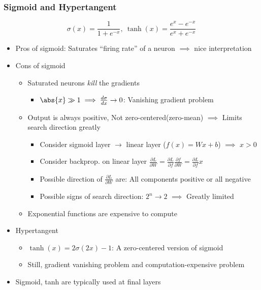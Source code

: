 \subsubsection*{Sigmoid and Hypertangent}
\begin{equation}
    \sigma(x)=\frac{1}{1+e^{-x}},~\tanh(x)=\frac{e^x-e^{-x}}{e^x+e^{-x}}
\end{equation}
\begin{itemize}
    \item Pros of sigmoid: Saturates ``firing rate'' of a neuron $\implies$ nice interpretation
    \item Cons of sigmoid
    \begin{itemize}
        \item Saturated neurons \textit{kill} the gradients
        \begin{itemize}
            \item $\abs{x}\gg1\implies\frac{d\sigma}{dx}\to0$: Vanishing gradient problem
        \end{itemize}
        \item Output is always positive, Not zero-centered(zero-mean) $\implies$ Limits search direction greatly
        \begin{itemize}
            \item Consider sigmoid layer $\to$ linear layer ($f(x)=Wx+b$) $\implies$ $x>0$
            \item Consider backprop. on linear layer $\frac{\partial L}{\partial W}=\frac{\partial L}{\partial f}\frac{\partial f}{\partial W}=\frac{\partial L}{\partial f}x$
            \item Possible direction of $\frac{\partial L}{\partial W}$ are: All components positive or all negative
            \item Possible signs of search direction: $2^n\to 2$ $\implies$ Greatly limited
        \end{itemize}
        \item Exponential functions are expensive to compute
    \end{itemize}
    \item Hypertangent
    \begin{itemize}
        \item $\tanh(x)=2\sigma(2x)-1$: A zero-centered version of sigmoid
        \item Still, gradient vanishing problem and computation-expensive problem
    \end{itemize}
    \item Sigmoid, tanh are typically used at final layers
\end{itemize}
\begin{figures}
\end{figures}

